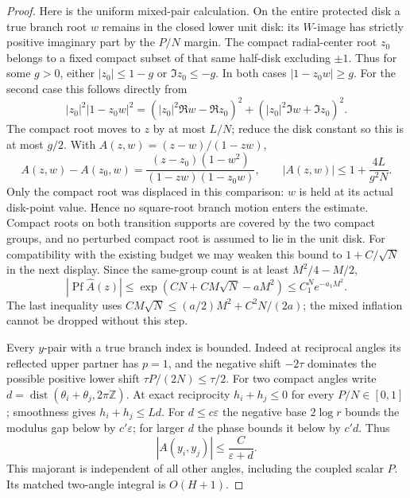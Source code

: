 \documentclass[11pt]{article}
\numberwithin{equation}{section}
\theoremstyle{definition}
\newcommand{\Z}{\mathbb Z}
\newcommand{\eps}{\varepsilon}
\newcommand{\Pf}{\operatorname{Pf}}
\newcommand{\dist}{\operatorname{dist}}
\begin{document}
\begin{proof}
Here is the uniform mixed-pair calculation. On the entire protected
disk a true branch root \(w\) remains in the closed lower unit disk:
its \(W\)-image has strictly positive imaginary part by the
\(P/N\) margin. The compact radial-center root \(z_0\) belongs to
a fixed compact subset of that same half-disk excluding \(\pm1\).
Thus for some \(g>0\), either \(|z_0|\le1-g\) or
\(\Im z_0\le-g\). In both cases \(|1-z_0w|\ge g\).
For the second case this follows directly from
\[
 |z_0|^2|1-z_0w|^2
 =(|z_0|^2\Re w-\Re z_0)^2+
   (|z_0|^2\Im w+\Im z_0)^2.
\]
The compact root moves to \(z\) by at most \(L/N\); reduce the
disk constant so this is at most \(g/2\). With
\(A(z,w)=(z-w)/(1-zw)\),
\[
 A(z,w)-A(z_0,w)=\frac{(z-z_0)(1-w^2)}{(1-zw)(1-z_0w)},\qquad
 |A(z,w)|\le1+\frac{4L}{g^2N}.
\]
Only the compact root was displaced in this comparison: \(w\)
is held at its actual disk-point value. Hence no square-root branch
motion enters the estimate. Compact roots on both transition supports
are covered by the two compact groups, and no perturbed compact root
is assumed to lie in the unit disk. For compatibility with the existing
budget we may weaken this bound to \(1+C/\sqrt N\) in the next display.
Since the same-group count is at least \(M^2/4-M/2\),
\[
 |\Pf\widehat A(z)|\le
 \exp(CN+CM\sqrt N-aM^2)\le C_1^N e^{-a_1M^2}.
\]
The last inequality uses
\(CM\sqrt N\le(a/2)M^2+C^2N/(2a)\); the mixed inflation cannot be
dropped without this step.

Every \(y\)-pair with a true branch index is bounded. Indeed at
reciprocal angles its reflected upper partner has \(p=1\), and
the negative shift \(-2\tau\) dominates the possible positive
lower shift \(\tau P/(2N)\le\tau/2\).
For two compact angles write
\(d=\dist(\theta_i+\theta_j,2\pi\Z)\).
At exact reciprocity \(h_i+h_j\le0\) for every \(P/N\in[0,1]\);
smoothness gives \(h_i+h_j\le Ld\).
For \(d\le c\eps\) the negative base \(2\log r\) bounds the
modulus gap below by \(c'\eps\); for larger \(d\) the phase
bounds it below by \(c'd\). Thus
\[
 |A(y_i,y_j)|\le\frac C{\eps+d}.
\]
This majorant is independent of all other angles, including the
coupled scalar \(P\). Its matched two-angle integral is \(O(H+1)\).


\end{proof}
\end{document}
